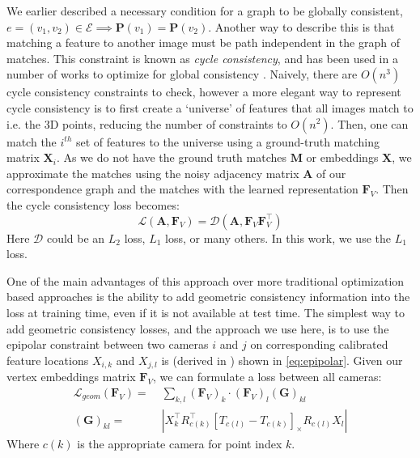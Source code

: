 \documentclass[10pt,twocolumn,letterpaper]{article}
\newcommand{\mat}[1]{\mathbf{#1}}
\newcommand{\cross}[1]{[#1]_{\times}}
\begin{document}
We earlier described a necessary condition for a graph to be globally consistent, $e = (v_1, v_2) \in \mathcal{E} \implies \mat{P}(v_1) = \mat{P}(v_2)$.
Another way to describe this is that matching a feature to another image must be path independent in the graph of matches.
This constraint is known as \textit{cycle consistency}, and has been used in a number of works to optimize for global consistency \cite{zhou2015multi, wang2017multi, leonardos2016distributed}.
Naively, there are $O(n^3)$ cycle consistency constraints to check, however a more elegant way to represent cycle consistency is to first create a `universe' of features that all images match to i.e. the 3D points, reducing the number of constraints to $O(n^2)$.
Then, one can match the $i^{th}$ set of features to the universe using a ground-truth matching matrix $\mat{X}_i$.
As we do not have the ground truth matches $\mat{M}$ or embeddings $\mat{X}$, we approximate the matches using the noisy adjacency matrix $\mat{A}$ of our correspondence graph and the matches with the learned representation $\mat{F}_V$.
Then the cycle consistency loss becomes:
\begin{equation}
\mathcal{L}(\mat{A}, \mat{F}_V) = \mathcal{D}(\mat{A}, \mat{F}_V \mat{F}_V^\top)
\end{equation}
Here $\mathcal{D}$ could be an $L_2$ loss, $L_1$ loss, or many others. In this work, we use the $L_1$ loss. 


One of the main advantages of this approach over more traditional optimization based approaches is the ability to add geometric consistency information into the loss at training time, even if it is not available at test time.
The simplest way to add geometric consistency losses, and the approach we use here, is to use the epipolar constraint between two cameras $i$ and $j$ on corresponding calibrated feature locations $X_{i,k}$ and $X_{j,l}$ is (derived in \cite{tron2014quotient}) shown in \ref{eq:epipolar}.
Given our vertex embeddings matrix $\mat{F}_V$, we can formulate a loss between all cameras:
\begin{align} 
\mathcal{L}_{geom}(\mat{F}_V)
=&\; \sum_{k,l} (\mat{F}_V)_{k} \cdot (\mat{F}_V)_{l} (\mat{G})_{kl} \label{eq:geom_cost2} \\
(\mat{G})_{kl} =&\; \left|X_{k}^\top R_{c(k)}^\top \cross{T_{c(l)} - T_{c(k)}}R_{c(l)} X_{l}\right| \label{eq:epipolar}
\end{align}
Where $c(k)$ is the appropriate camera for point index $k$.
\end{document}
